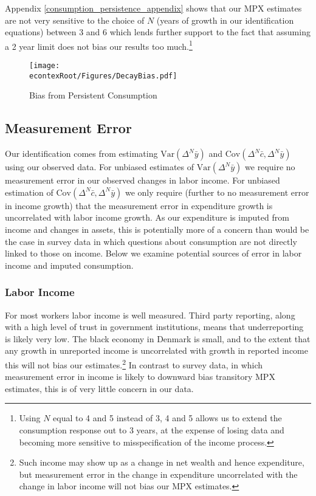 \documentclass[titlepage]{\econtex}\newcommand{\texname}{ConsumptionHeterogeneity}
\begin{document}
Appendix \ref{consumption_persistence_appendix} shows that our MPX estimates are not very sensitive to the choice of $N$ (years of growth in our identification equations) between 3 and 6 which lends further support to the fact that assuming a 2 year limit does not bias our results too much.\footnote{Using $N$ equal to 4 and 5 instead of 3, 4 and 5 allows us to extend the consumption response out to 3 years, at the expense of losing data and becoming more sensitive to misspecification of the income process.}
\begin{figure} 
	\begin{centering}
		\texttt{[image: \\econtexRoot/Figures/DecayBias.pdf]}
		\caption{Bias from Persistent Consumption}
		\label{fig:DecayBias}
	\end{centering}
\end{figure}

\subsection{Measurement Error} \label{Measurement_error}
Our identification comes from estimating $\mathrm{Var}(\Delta^N \bar{y})$ and $\mathrm{Cov}(\Delta^N \bar{c},\Delta^N \bar{y})$ using our observed data. For unbiased estimates of $\mathrm{Var}(\Delta^N \bar{y})$ we require no measurement error in our observed changes in labor income. For unbiased estimation of $\mathrm{Cov}(\Delta^N \bar{c},\Delta^N \bar{y})$ we only require (further to no measurement error in income growth) that the measurement error in expenditure growth is uncorrelated with labor income growth. As our expenditure is imputed from income and changes in assets, this is potentially more of a concern than would be the case in survey data in which questions about consumption are not directly linked to those on income. Below we examine potential sources of error in labor income and imputed consumption.

\subsubsection{Labor Income}
For most workers labor income is well measured. Third party reporting, along with a high level of trust in government institutions, means that underreporting is likely very low. The black economy in Denmark is small, and to the extent that any growth in unreported income is uncorrelated with growth in reported income this will not bias our estimates.\footnote{Such income may show up as a change in net wealth and hence expenditure, but measurement error in the change in expenditure uncorrelated with the change in labor income will not bias our MPX estimates.} In contrast to survey data, in which measurement error in income is likely to downward bias transitory MPX estimates, this is of very little concern in our data.
\end{document}
